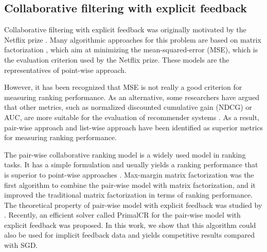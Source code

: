 \documentclass[conference]{IEEEtran}
\numberwithin{equation}{section}
\newtheorem{sampling strategy}{Sampling Strategy}
\begin{document}
\subsection{Collaborative filtering with explicit feedback}


Collaborative filtering with explicit feedback was originally motivated by the Netflix prize \cite{netflix}. Many algorithmic approaches for this problem are based on matrix factorization \cite{pmf,korenmf,sideinformation}, which aim at minimizing the mean-squared-error (MSE), which is the evaluation criterion used by the Netflix prize. These models are the representatives of point-wise approach.

However, it has been recognized that MSE is not really a good criterion for measuring ranking performance. As an alternative, some researchers have argued that other metrics, such as normalized discounted cumulative gain (NDCG) or AUC, are more suitable for the evaluation of recommender systems \cite{collaborativeranking}. As a result, pair-wise approach and list-wise approach have been identified as superior metrics for measuring ranking performance. 

The pair-wise collaborative ranking model is a widely used model in ranking tasks. It has a simple formulation and usually yields a ranking performance that is superior to point-wise approaches \cite{bpr, cr, crlinear}. 
Max-margin matrix factorization \cite{maxmargin} was the first algorithm to combine the pair-wise model with matrix factorization, and it improved the traditional matrix factorization in terms of ranking performance. The theoretical property of pair-wise model with explicit feedback was studied by \cite{cr,pcfpr}. Recently, an efficient solver called \textsf{PrimalCR} \cite{crlinear} for the pair-wise model with explicit feedback was proposed. In this work, we show that this algorithm could also be used for implicit feedback data and yields competitive results compared with SGD.
\end{document}
